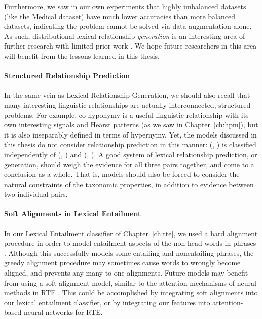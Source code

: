 Furthermore, we saw in our own experiments that highly imbalanced datasets
(like the Medical dataset) have much lower accuracies than more balanced
datasets, indicating the problem cannot be solved via data augmentation alone.
As such, distributional lexical relationship {\em generation} is an interesting
area of further research with limited prior work
\cite{fu:2014:acl,nayak:2015:techreport,espinosaanke:2016:emnlp}. We hope
future researchers in this area will benefit from the lessons learned in this
thesis.

\paragraph{Structured Relationship Prediction}

In the same vein as Lexical Relationship Generation, we should also recall that
many interesting linguistic relationships are actually interconnected,
structured problems. For example, co-hyponymy is a useful linguistic
relationship with its own interesting signals and Hearst patterns (as we saw in
Chapter~\ref{ch:hpm}), but it is also inseparably defined in terms of
hypernymy. Yet, the models discussed in this thesis do not consider relationship
prediction in this manner: (, ) is classified independently
of (, ) and (, ). A good system of
lexical relationship prediction, or generation, should weigh the evidence for
all three pairs together, and come to a conclusion as a whole. That is, models
should also be forced to consider the natural constraints of the taxonomic
properties, in addition to evidence between two individual pairs.

\paragraph{Soft Alignments in Lexical Entailment}

In our Lexical Entailment classifier of Chapter~\ref{ch:rte}, we used a
hard alignment procedure in order to model entailment aspects of the
non-head words in phrases . Although this
successfully models some entailing and nonentailing phrases, the greedy
alignment procedure may sometimes cause words to wrongly become aligned, and
prevents any many-to-one alignments. Future models may benefit from using
a soft alignment model, similar to the attention mechanisms of neural methods
in RTE \cite{bowman:2015:emnlp,parikh:2016:emnlp}. This could be accomplished
by integrating soft alignments into our lexical entailment classifier, or
by integrating our features into attention-based neural networks for RTE.


